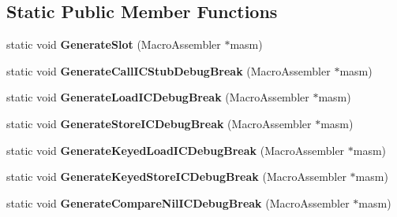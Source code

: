 \subsection*{Static Public Member Functions}
\begin{DoxyCompactItemize}
\item 
\hypertarget{classv8_1_1internal_1_1_debug_codegen_a1824903aed6576ada41756c80c44bea7}{}static void {\bfseries Generate\+Slot} (Macro\+Assembler $\ast$masm)\label{classv8_1_1internal_1_1_debug_codegen_a1824903aed6576ada41756c80c44bea7}

\item 
\hypertarget{classv8_1_1internal_1_1_debug_codegen_a94e5891e0863618956e1b48a8dbb1e55}{}static void {\bfseries Generate\+Call\+I\+C\+Stub\+Debug\+Break} (Macro\+Assembler $\ast$masm)\label{classv8_1_1internal_1_1_debug_codegen_a94e5891e0863618956e1b48a8dbb1e55}

\item 
\hypertarget{classv8_1_1internal_1_1_debug_codegen_a4d5cfd768cf858ab34210d53d67c8ea7}{}static void {\bfseries Generate\+Load\+I\+C\+Debug\+Break} (Macro\+Assembler $\ast$masm)\label{classv8_1_1internal_1_1_debug_codegen_a4d5cfd768cf858ab34210d53d67c8ea7}

\item 
\hypertarget{classv8_1_1internal_1_1_debug_codegen_a1d99bc4c602716778a00065d8e62f575}{}static void {\bfseries Generate\+Store\+I\+C\+Debug\+Break} (Macro\+Assembler $\ast$masm)\label{classv8_1_1internal_1_1_debug_codegen_a1d99bc4c602716778a00065d8e62f575}

\item 
\hypertarget{classv8_1_1internal_1_1_debug_codegen_aefc79f1dff39509338c2f6ddb2501bb9}{}static void {\bfseries Generate\+Keyed\+Load\+I\+C\+Debug\+Break} (Macro\+Assembler $\ast$masm)\label{classv8_1_1internal_1_1_debug_codegen_aefc79f1dff39509338c2f6ddb2501bb9}

\item 
\hypertarget{classv8_1_1internal_1_1_debug_codegen_a85f9ad0f67dfd02d6dcc7f3272261c64}{}static void {\bfseries Generate\+Keyed\+Store\+I\+C\+Debug\+Break} (Macro\+Assembler $\ast$masm)\label{classv8_1_1internal_1_1_debug_codegen_a85f9ad0f67dfd02d6dcc7f3272261c64}

\item 
\hypertarget{classv8_1_1internal_1_1_debug_codegen_a8321a474f915a226f3beb972c724b096}{}static void {\bfseries Generate\+Compare\+Nil\+I\+C\+Debug\+Break} (Macro\+Assembler $\ast$masm)\label{classv8_1_1internal_1_1_debug_codegen_a8321a474f915a226f3beb972c724b096}


\end{DoxyCompactItemize}
